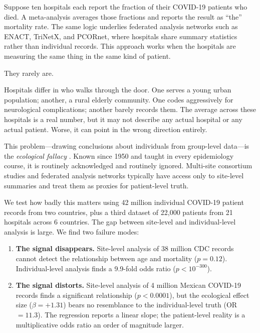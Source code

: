 \documentclass{article}
\begin{document}
Suppose ten hospitals each report the fraction of their COVID-19 patients who
died.  A meta-analysis averages those fractions and reports the result as
``the'' mortality rate.  The same logic underlies federated analysis
networks such as ENACT, TriNetX, and PCORnet, where hospitals share summary
statistics rather than individual records.  This approach works when the
hospitals are measuring the same thing in the same kind of patient.

They rarely are.

Hospitals differ in who walks through the door.  One serves a young urban
population; another, a rural elderly community.  One codes aggressively for
neurological complications; another barely records them.  The average across
these hospitals is a real number, but it may not describe any actual hospital
or any actual patient.  Worse, it can point in the wrong direction entirely.

This problem---drawing conclusions about individuals from group-level
data---is the \emph{ecological fallacy}
\cite{robinson1950ecological}.  Known since 1950 and taught in every
epidemiology course, it is routinely acknowledged and routinely ignored.
Multi-site consortium studies and federated analysis networks typically have
access only to site-level summaries and treat them as proxies for
patient-level truth.

We test how badly this matters using 42 million individual COVID-19 patient
records from two countries, plus a third dataset of 22,000 patients from 21
hospitals across 6 countries.  The gap between site-level and
individual-level analysis is large.  We find two failure modes:

\begin{enumerate}
\item \textbf{The signal disappears.}  Site-level analysis of 38 million CDC
records cannot detect the relationship between age and mortality
($p = 0.12$).  Individual-level analysis finds a 9.9-fold odds ratio
($p < 10^{-300}$).

\item \textbf{The signal distorts.}  Site-level analysis of 4 million
Mexican COVID-19 records finds a significant relationship
($p < 0.0001$), but the ecological effect size ($\beta = +1.31$) bears no
resemblance to the individual-level truth (OR $= 11.3$).  The regression
reports a linear slope; the patient-level reality is a multiplicative odds
ratio an order of magnitude larger.
\end{enumerate}
\end{document}
